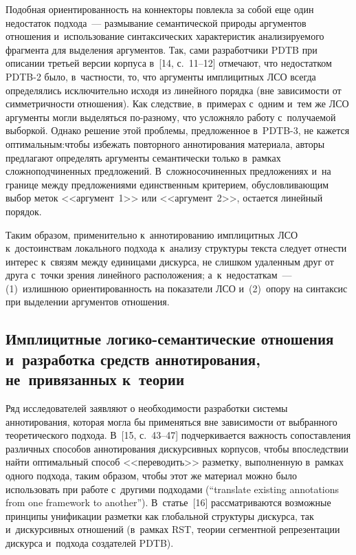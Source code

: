 \begin{multicols}{2}
Подобная ориентированность на коннекторы повлекла за собой еще один 
недостаток подхода~--- размывание семантической природы аргументов 
отношения и~использование синтаксических характеристик анализируемого 
фрагмента для выделения аргументов. Так, сами разработчики PDTB при 
описании третьей версии корпуса в~[14, с.~11--12] отмечают, что 
недостатком PDTB-2 было, в~частности, то, что аргументы имплицитных 
ЛСО всегда определялись исключительно исходя из линейного порядка (вне 
за\-ви\-си\-мости от сим\-мет\-рич\-ности отношения). Как следствие, в~примерах 
с~одним и~тем же ЛСО аргументы могли выделяться по-разному, что 
услож\-ня\-ло работу с~получаемой выборкой. Однако решение этой проб\-ле\-мы, 
предложенное в~PDTB-3, не кажется оптимальным:\linebreak чтобы избежать 
повторного \mbox{аннотирования} материала, авторы предлагают определять 
аргументы семантически только в~рамках сложноподчиненных предложений. 
В~сложносочиненных предложениях и~на границе между предложениями 
единственным критерием, обуслов\-ли\-ва\-ющим выбор меток <<аргумент~1>> 
или <<аргумент~2>>, остается линейный порядок.
{

}

Таким образом, применительно к~аннотированию имплицитных ЛСО 
к~достоинствам локального подхода к~анализу структуры текста следует 
от\-нес\-ти интерес к~связям между единицами дискурса, не слишком 
удаленным друг от друга с~точки зрения линейного расположения; 
а~к~недостаткам~--- (1)~излишнюю ориентированность на показатели ЛСО 
и~(2)~опору на синтаксис при выделении аргументов отношения.

\vspace*{-6pt}

\subsection{Имплицитные логико-семантические отношения и~разработка средств аннотирования, 
не~привязанных к~теории} %

\vspace*{-2pt}

Ряд исследователей заявляют о необходимости разработки системы 
аннотирования, которая могла бы применяться вне зависимости от 
выбранного теоретического подхода. В~[15, с.~43--47] подчеркивается 
важность сопоставления различных способов аннотирования дискурсивных 
корпусов, чтобы впоследствии найти оптимальный способ <<переводить>> 
разметку, выполненную в~рамках одного подхода, таким образом, чтобы этот 
же материал можно было использовать при работе с~другими подходами 
(``translate existing annotations from one framework to another''). В~статье~[16] 
рассматриваются возможные принципы унификации разметки как 
глобальной структуры дискурса, так и~дискурсивных отношений (в~рамках 
RST, теории сегментной репрезентации дискурса 
и~подхода созда\-те\-лей PDTB).


\end{multicols}
